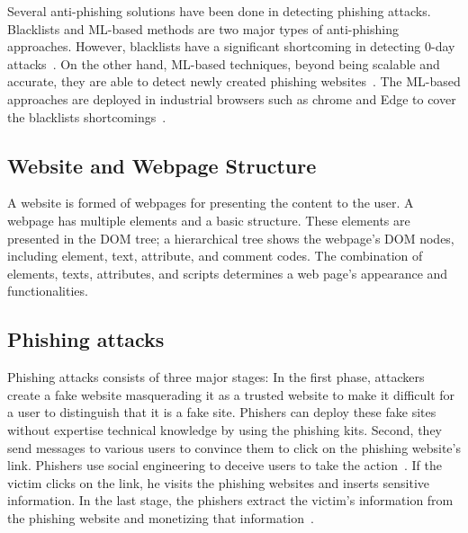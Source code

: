 \documentclass[letterpaper,twocolumn,10pt]{article}
\begin{document}
Several anti-phishing solutions have been done in detecting phishing attacks. Blacklists and ML-based methods are two major types of anti-phishing approaches. However, blacklists have a significant shortcoming in detecting 0-day attacks~\cite{oest2019phishfarm}. 
On the other hand, ML-based techniques, beyond being scalable and accurate, they are able to detect newly created phishing websites~\cite{whittaker2010large}.
The ML-based approaches are deployed in industrial browsers such as chrome and Edge to cover the blacklists shortcomings~\cite{safebrowsing,mjcaparas}.

\subsection{Website and Webpage Structure}
A website is formed of webpages for presenting the content to the user. A webpage has multiple elements and a basic structure. These elements are presented in the DOM tree; a hierarchical tree shows the webpage's DOM nodes, including element, text, attribute, and comment codes.
The combination of elements, texts, attributes, and scripts determines a web page's appearance and functionalities. 

\subsection{Phishing attacks}




Phishing attacks consists of three major stages: In the first phase, attackers create a fake website masquerading it as a trusted website to make it difficult for a user to distinguish that it is a fake site. Phishers can deploy these fake sites without expertise technical knowledge by using the phishing kits. Second, they send messages to various users to convince them to click on the phishing website's link. Phishers use social engineering to deceive users to take the action~\cite{dhamija2006phishing,thomas2013trafficking}. If the victim clicks on the link, he visits the phishing websites and inserts sensitive information. In the last stage, the phishers extract the victim's information from the phishing website and monetizing that information~\cite{gupta2018defending}.
\end{document}
